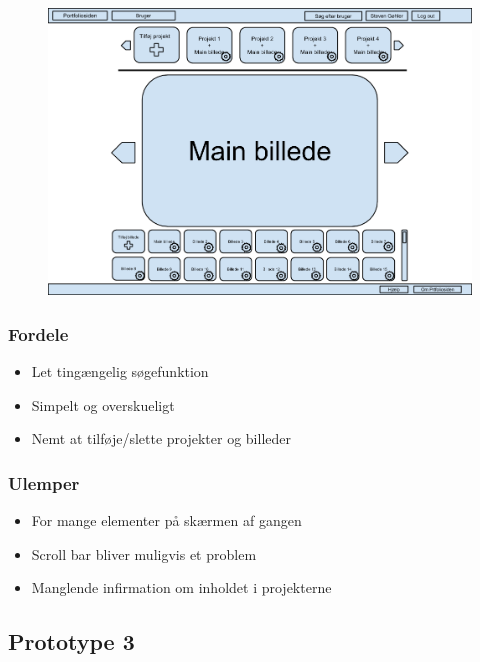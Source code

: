 \documentclass[a4paper,titlepage,fleqn,12pt]{article}
\begin{document}
\begin{figure}[H]
	\includegraphics[width=\textwidth]{Prototype_1_logged_in.png}
\end{figure}

\subsubsection{Fordele}
\begin{itemize}
	\item Let tingængelig søgefunktion
	\item Simpelt og overskueligt
	\item Nemt at tilføje/slette projekter og billeder
\end{itemize}

\subsubsection{Ulemper}
\begin{itemize}
	\item For mange elementer på skærmen af gangen
	\item Scroll bar bliver muligvis et problem
	\item Manglende infirmation om inholdet i projekterne
\end{itemize}

\subsection{Prototype 3}
\end{document}
